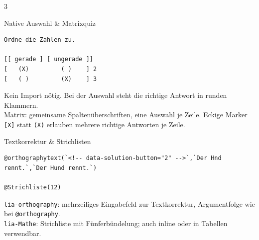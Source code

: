 \documentclass[a4paper,landscape,9pt]{extarticle}
\newcommand{\prevsm}[1]{{\footnotesize\color{muted} #1}}
\begin{document}
\begin{multicols}{3}
\begin{extracard}{Native Auswahl \& Matrixquiz}
\begin{lstlisting}[language=lia]
Ordne die Zahlen zu.

[[ gerade ] [ ungerade ]]
[   (X)         ( )    ] 2
[   ( )         (X)    ] 3
\end{lstlisting}
\tcblower
\prevsm{Kein Import nötig. Bei der Auswahl steht die richtige Antwort in runden Klammern.\\[2pt]
Matrix: gemeinsame Spaltenüberschriften, eine Auswahl je Zeile. Eckige Marker \texttt{[X]} statt \texttt{(X)} erlauben mehrere richtige Antworten je Zeile.}
\end{extracard}

\begin{extracard}{Textkorrektur \& Strichlisten}
\begin{lstlisting}[language=lia]
@orthographytext(`<!-- data-solution-button="2" -->`,`Der Hnd rennt.`,`Der Hund rennt.`)

@Strichliste(12)
\end{lstlisting}
\tcblower
\prevsm{\texttt{lia-orthography}: mehrzeiliges Eingabefeld zur Textkorrektur, Argumentfolge wie bei \texttt{@orthography}.\\[2pt]
\texttt{lia-Mathe}: Strichliste mit Fünferbündelung; auch inline oder in Tabellen verwendbar.}
\end{extracard}

\end{multicols}
\endgroup
\end{document}
